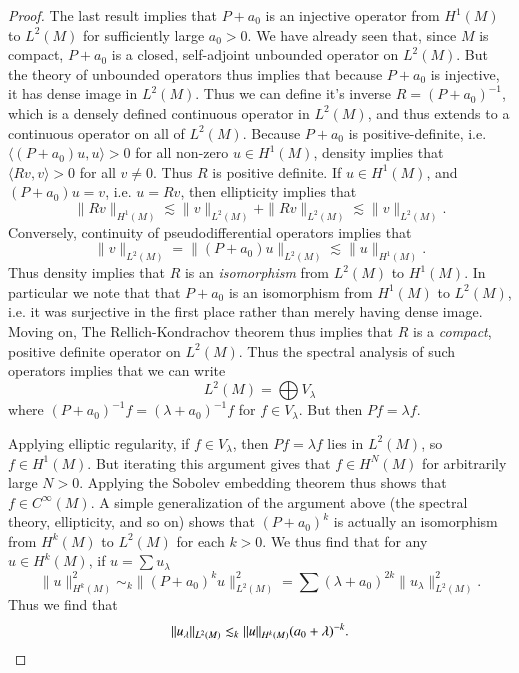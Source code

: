 \begin{proof}
    The last result implies that $P + a_0$ is an injective operator from $H^1(M)$ to $L^2(M)$ for sufficiently large $a_0 > 0$. We have already seen that, since $M$ is compact, $P + a_0$ is a closed, self-adjoint unbounded operator on $L^2(M)$. But the theory of unbounded operators thus implies that because $P + a_0$ is injective, it has dense image in $L^2(M)$. Thus we can define it's inverse $R = (P + a_0)^{-1}$, which is a densely defined continuous operator in $L^2(M)$, and thus extends to a continuous operator on all of $L^2(M)$. Because $P + a_0$ is positive-definite, i.e. $\langle (P + a_0) u, u \rangle > 0$ for all non-zero $u \in H^1(M)$, density implies that $\langle Rv, v \rangle > 0$ for all $v \neq 0$. Thus $R$ is positive definite. If $u \in H^1(M)$, and $(P + a_0) u = v$, i.e. $u = Rv$, then ellipticity implies that
    \[ \| Rv \|_{H^1(M)} \lesssim \| v \|_{L^2(M)} + \| Rv \|_{L^2(M)} \lesssim \| v \|_{L^2(M)}. \]
    Conversely, continuity of pseudodifferential operators implies that
    \[ \| v \|_{L^2(M)} = \| (P + a_0) u \|_{L^2(M)} \lesssim \| u \|_{H^1(M)}. \]
    Thus density implies that $R$ is an \emph{isomorphism} from $L^2(M)$ to $H^1(M)$. In particular we note that that $P + a_0$ is an isomorphism from $H^1(M)$ to $L^2(M)$, i.e. it was surjective in the first place rather than merely having dense image. Moving on, The Rellich-Kondrachov theorem thus implies that $R$ is a \emph{compact}, positive definite operator on $L^2(M)$. Thus the spectral analysis of such operators implies that we can write
    \[ L^2(M) = \bigoplus V_\lambda \]
    where $(P + a_0)^{-1} f = (\lambda + a_0)^{-1} f$ for $f \in V_\lambda$. But then $Pf = \lambda f$.

    Applying elliptic regularity, if $f \in V_\lambda$, then $Pf = \lambda f$ lies in $L^2(M)$, so $f \in H^1(M)$. But iterating this argument gives that $f \in H^N(M)$ for arbitrarily large $N > 0$. Applying the Sobolev embedding theorem thus shows that $f \in C^\infty(M)$. A simple generalization of the argument above (the spectral theory, ellipticity, and so on) shows that $(P + a_0)^k$ is actually an isomorphism from $H^k(M)$ to $L^2(M)$ for each $k > 0$. We thus find that for any $u \in H^k(M)$, if $u = \sum u_\lambda$
    \[ \| u \|_{H^k(M)}^2 \sim_k \| (P + a_0)^k u \|_{L^2(M)}^2 = \sum (\lambda + a_0)^{2k} \| u_\lambda \|^2_{L^2(M)}. \]
    Thus we find that
    \[ \| u_\lambda \|_{L^2(M)} \lesssim_k \| u \|_{H^k(M)} (a_0 + \lambda)^{-k}. \qedhere \] 
\end{proof}

